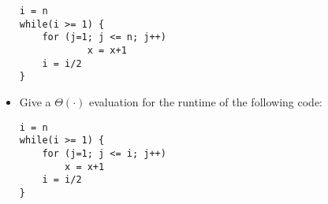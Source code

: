\documentclass[11pt]{article}
\begin{document}
\begin{itemize}
	      \begin{lstlisting}[numbers=none, keywordstyle=\bfseries, frame=none, title=\(\Theta{(n \log{n})}\)]
i = n
while(i >= 1) {
	for (j=1; j <= n; j++)
			x = x+1
	i = i/2
}    
	\end{lstlisting}
	      
	\item Give a $\Theta( \cdot)$ evaluation for the runtime of the following code:
	      \begin{lstlisting}[numbers=none, keywordstyle=\bfseries, frame=none, title={\(\Theta{(n \log{n})}\)}]
i = n
while(i >= 1) {
	for (j=1; j <= i; j++)
		x = x+1
	i = i/2
}
	\end{lstlisting}

\end{itemize}
\end{document}
